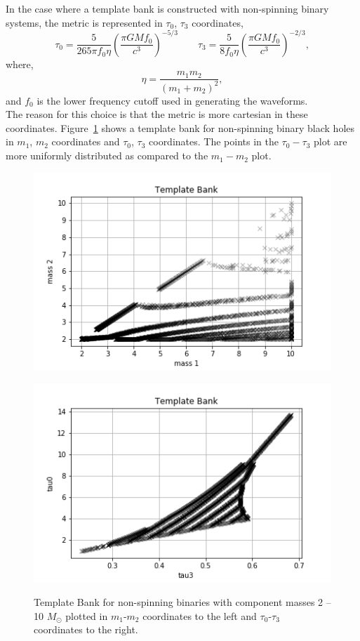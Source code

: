 \documentclass{article}
\begin{document}
In the case where a template bank is constructed with non-spinning binary systems, the metric is represented in $\tau_0$, $\tau_3$ coordinates,~\cite{TmplBank}
\begin{equation}
    \tau_0 = \frac{5}{265 \pi f_0 \eta}\left(\frac{\pi G M f_0}{c^3}
    \right)^{-5/3} \qquad
     \tau_3 = \frac{5}{8 f_0 \eta} \left( \frac{\pi G M f_0}{c^3}\right)^{-2/3},
\end{equation}
where,
\begin{equation}
    \eta = \frac{m_1 m_2}{(m_1 + m_2)^2}, \label{Eta}
\end{equation}
and $f_0$ is the lower frequency cutoff used in generating the waveforms. \\
 The reason for this choice is that the metric is more cartesian in these coordinates.
 Figure~\ref{fig:mtau} shows a template bank for
non-spinning binary black holes in $m_1$, $m_2$ coordinates and $\tau_0$, $\tau_3$ coordinates. The points in the $\tau_0 - \tau_3$ plot are more uniformly distributed as compared to the $m_1 - m_2$ plot.
\begin{figure}[h]
    \begin{minipage}{0.5\textwidth}
        \includegraphics[scale=0.5]{m1m2.png}
        \label{fig:m1m2}
    \end{minipage}
    \begin{minipage}{0.5\textwidth}
        \includegraphics[scale=0.5]{tau0tau3.png}
        \label{fig:tau0tau3}
    \end{minipage}
    \caption{Template Bank for non-spinning binaries with component masses
2 -- 10 $M_{\odot}$ plotted in $m_1$-$m_2$ coordinates to the left and
$\tau_0$-$\tau_3$ coordinates to the right. \label{fig:mtau}}
\end{figure}
\end{document}
